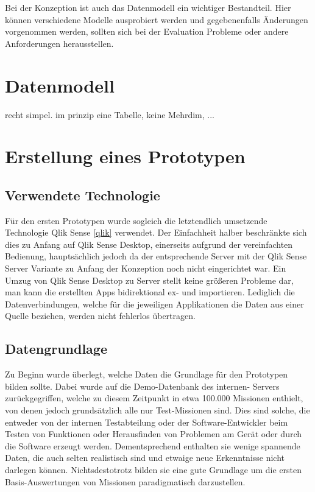 Bei der Konzeption ist auch das Datenmodell ein wichtiger Bestandteil. 
Hier können verschiedene Modelle ausprobiert werden und gegebenenfalls Änderungen vorgenommen werden, sollten sich bei der Evaluation Probleme oder andere Anforderungen herausstellen.

\section{Datenmodell}
recht simpel. im prinzip eine Tabelle, keine Mehrdim, ...

\section{Erstellung eines Prototypen}
\subsection{Verwendete Technologie}
Für den ersten Prototypen wurde sogleich die letztendlich umsetzende Technologie Qlik Sense \ref{qlik} verwendet. 
Der Einfachheit halber beschränkte sich dies zu Anfang auf Qlik Sense Desktop, einerseits aufgrund der vereinfachten Bedienung, hauptsächlich jedoch da der entsprechende Server mit der Qlik Sense Server Variante zu Anfang der Konzeption noch nicht eingerichtet war. 
Ein Umzug von Qlik Sense Desktop zu Server stellt keine größeren Probleme dar, man kann die erstellten Apps bidirektional ex- und importieren. 
Lediglich die Datenverbindungen, welche für die jeweiligen Applikationen die Daten aus einer Quelle beziehen, werden nicht fehlerlos übertragen.

\subsection{Datengrundlage}
Zu Beginn wurde überlegt, welche Daten die Grundlage für den Prototypen bilden sollte.
Dabei wurde auf die Demo-Datenbank des internen\cweba - Servers zurückgegriffen, welche zu diesem Zeitpunkt in etwa 100.000 Missionen enthielt, von denen jedoch grundsätzlich alle nur Test-Missionen sind. 
Dies sind solche, die entweder von der internen Testabteilung oder der Software-Entwickler beim Testen von Funktionen oder Herausfinden von Problemen am Gerät oder durch die Software erzeugt werden. 
Dementsprechend enthalten sie wenige spannende Daten, die auch selten realistisch sind und etwaige neue Erkenntnisse nicht darlegen können. 
Nichtsdestotrotz bilden sie eine gute Grundlage um die ersten Basis-Auswertungen von Missionen paradigmatisch darzustellen. 

